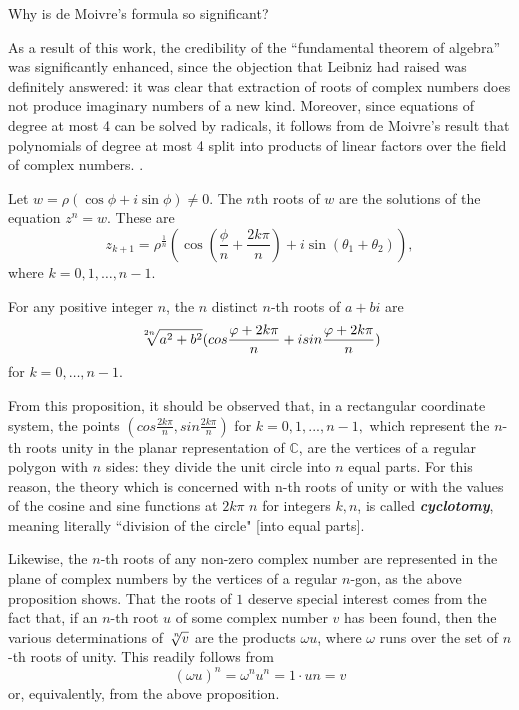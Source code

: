 \documentclass[11pt,reqno,oneside,a4paper]{article}
\begin{document}
\begin{rmk}
	Why is de Moivre's formula so significant?
	
	As a result of this work, the credibility of the ``fundamental theorem of algebra” was significantly enhanced, since the objection that Leibniz had raised was definitely answered: it was clear that extraction of roots of complex numbers does not produce imaginary numbers of a new kind. Moreover, since equations of degree at most 4 can be solved by radicals, it follows from de Moivre’s result that polynomials of degree at most 4 split into products of linear factors over the field of complex numbers.  \cite{Tig2016a}.
\end{rmk}

\begin{prop}
	Let $w = \rho (\cos \phi + i\sin \phi) \neq 0.$ The $n$th roots of $w$ are the solutions of the equation $z^n= w$. These are
	$$z_{k+1} = \rho^{\frac{1}{n}}(\cos(\frac{\phi}{n}+\frac{2k\pi}{n})+ i\sin(\theta_1 +\theta_2)),$$
	where $k = 0,1,\dots,n-1$.
\end{prop}

\begin{prop}
	For any positive integer $n$, the $n$ distinct $n$-th roots of $a+bi$ are 
	$$\sqrt[\leftroot{-2}\uproot{2}{2n}]{a^2+b^2}(cos\frac{\varphi+2k\pi}{n} + isin\frac{\varphi+2k\pi}{n})$$
	for $k = 0,\dots,n-1.$
\end{prop}

\begin{rmk}
	From this proposition, it should be observed that, in a rectangular coordinate system, the points $(cos\frac{2k\pi}{n}, sin\frac{2k\pi}{n})$ for $k = 0, 1, . . . , n-1,$ which represent the $n$-th roots unity in the planar representation of $\mathbb{C}$, are the vertices of a regular polygon with $n$ sides: they divide the unit circle into $n$ equal parts. For this reason, the theory which is concerned with n-th roots of unity or with the values of the cosine and sine functions at $2k\pi$ $n$ for integers $k, n$, is called \textbf{\textit{cyclotomy}}, meaning literally ``division of the circle" [into equal parts].
	
	 Likewise, the $n$-th roots of any non-zero complex number are represented in the plane of complex numbers by the vertices of a regular $n$-gon, as the above proposition shows. That the roots of $1$ deserve special interest comes from the fact that, if an $n$-th root $u$ of some complex number $v$ has been found, then the various determinations of $\sqrt[\leftroot{-2}\uproot{2}{n}]{v}$ are the products $\omega u$, where $\omega$ runs over the set of $n$-th roots of unity. This readily follows from 
	$$(\omega u)^n = \omega^nu^n = 1 \cdot un = v$$
	or, equivalently, from the above proposition. \cite{Tig2016a}
\end{rmk}
\end{document}
